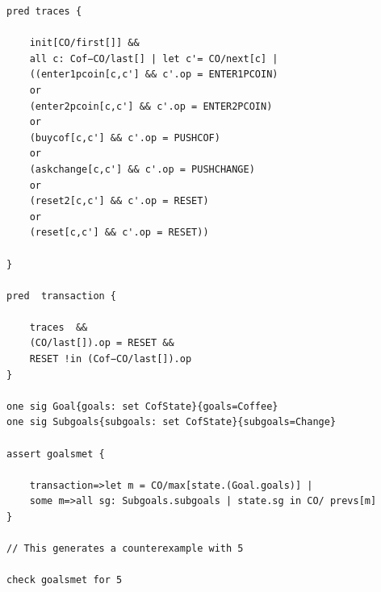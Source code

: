 \documentclass[a4paper,12pt]{report}
\begin{document}
\begin{verbatim}
pred traces {

	init[CO/first[]] &&
	all c: Cof−CO/last[] | let c'= CO/next[c] |
	((enter1pcoin[c,c'] && c'.op = ENTER1PCOIN)
	or
	(enter2pcoin[c,c'] && c'.op = ENTER2PCOIN)
	or
	(buycof[c,c'] && c'.op = PUSHCOF)
	or
	(askchange[c,c'] && c'.op = PUSHCHANGE)
	or
	(reset2[c,c'] && c'.op = RESET)
	or
	(reset[c,c'] && c'.op = RESET))

}

pred  transaction {

	traces  &&
	(CO/last[]).op = RESET &&
	RESET !in (Cof−CO/last[]).op
}

one sig Goal{goals: set CofState}{goals=Coffee}
one sig Subgoals{subgoals: set CofState}{subgoals=Change}

assert goalsmet {

	transaction=>let m = CO/max[state.(Goal.goals)] |
	some m=>all sg: Subgoals.subgoals | state.sg in CO/ prevs[m]
}

// This generates a counterexample with 5

check goalsmet for 5

\end{verbatim}
\end{document}
